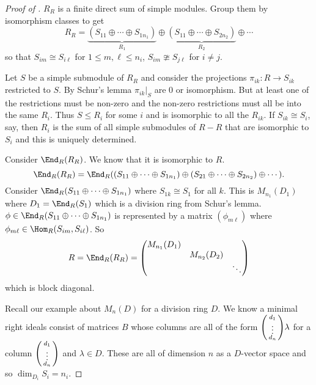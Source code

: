 \documentclass[a4paper]{article}
\begin{document}
\begin{proof}[Proof of ]
  \(R_R\) is a finite direct sum of simple modules. Group them by isomorphism classes to get
  \[
    R_R = \underbrace{(S_{11} \oplus \cdots \oplus S_{1 n_1})}_{R_1} \oplus \underbrace{(S_{11} \oplus \cdots \oplus S_{2 n_2})}_{R_2} \oplus \cdots
  \]
  so that \(S_{im} \cong S_{i\ell}\) for \(1 \leq m, \ell \leq n_i\), \(S_{im} \ncong S_{j\ell}\) for \(i \neq j\).

  Let \(S\) be a simple submodule of \(R_R\) and consider the projections \(\pi_{ik}: R \to S_{ik}\) restricted to \(S\). By Schur's lemma \(\pi_{ik}|_S\) are \(0\) or isomorphism. But at least one of the restrictions must be non-zero and the non-zero restrictions must all be into the same \(R_i\). Thus \(S \leq R_i\) for some \(i\) and is isomorphic to all the \(R_{ik}\). If \(S_{ik} \cong S_i\), say, then \(R_i\) is the sum of all simple submodules of \(R-R\) that are isomorphic to \(S_i\) and this is uniquely determined.

  Consider \(\End_R(R_R)\). We know that it is isomorphic to \(R\).
  \[
    \End_R(R_R) = \End_R((S_{11} \oplus \cdots \oplus S_{1n_1}) \oplus (S_{21} \oplus \cdots \oplus S_{2 n_2}) \oplus \cdots).
  \]
  Consider \(\End_R(S_{11} \oplus \cdots \oplus S_{1 n_1})\) where \(S_{1k} \cong S_1\) for all \(k\). This is \(M_{n_1}(D_1)\) where \(D_1 = \End_R(S_1)\) which is a division ring from Schur's lemma. \(\phi \in \End_R(S_{11} \oplus \cdots \oplus S_{1n_1})\) is represented by a matrix \((\phi_{m\ell})\) where \(\phi_{m\ell} \in \Hom_R(S_{im}, S_{i\ell})\). So
  \[
    R = \End_R(R_R) =
    \begin{pmatrix}
      M_{n_1}(D_1) \\
      & M_{n_2}(D_2) \\
      & & \ddots
    \end{pmatrix}
  \]
  which is block diagonal.

  Recall our example about \(M_n(D)\) for a division ring \(D\). We know a minimal right ideals consist of matrices \(B\) whose columns are all of the form \(
  \begin{psmallmatrix}
    d_1 \\
    \vdots \\
    d_n
  \end{psmallmatrix}
  \lambda\) for a column \(
  \begin{psmallmatrix}
    d_1 \\
    \vdots \\
    d_n
  \end{psmallmatrix}
  \) and \(\lambda \in D\). These are all of dimension \(n\) as a \(D\)-vector space and so \(\dim_{D_i} S_i = n_i\).
\end{proof}
\end{document}

